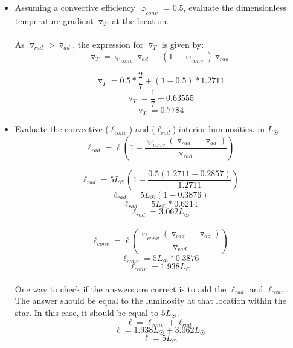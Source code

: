 \documentclass[10pt]{article}
\begin{document}
\begin{itemize}[label=\textbullet]
\item Assuming a convective efficiency $\upvarphi_{conv}$ = 0.5, evaluate the dimensionless temperature gradient $\triangledown_{T}$ at the location.
\\ \\
As $\triangledown_{rad} > \triangledown_{ad}$, the expression for $\triangledown_{T}$ is given by:
\[ \triangledown_{T} = \upvarphi_{conv} \triangledown_{ad} + (1 - \upvarphi_{conv}) \triangledown_{rad}\]

\[ \triangledown_{T} = 0.5*\frac{2}{7} + (1 - 0.5) * 1.2711\]
\[ \triangledown_{T} = \frac{1}{7} + 0.63555\]
\[ \triangledown_{T} = 0.7784\]
\item Evaluate the convective ($\ell_{conv}$) and ($\ell_{rad}$) interior luminosities, in $L_{\astrosun}$
\\
\[ \ell_{rad} = \ell (1 - \frac{\upvarphi_{conv} (\triangledown_{rad} - \triangledown_{ad})}{\triangledown_{rad}})\]

\[ \ell_{rad} = 5L_{\astrosun} (1 - \frac{0.5 (1.2711 - 0.2857)}{1.2711})\]
\[ \ell_{rad} = 5L_{\astrosun} (1 - 0.3876)\]
\[ \ell_{rad} = 5L_{\astrosun}*0.6214\]
\[ \ell_{rad} = 3.062L_{\astrosun}\] \\

\[ \ell_{conv} = \ell (\frac{\upvarphi_{conv} (\triangledown_{rad} - \triangledown_{ad})}{\triangledown_{rad}})\]
\[ \ell_{conv} = 5L_{\astrosun}*0.3876\]
\[ \ell_{conv} = 1.938L_{\astrosun}\]\\

One way to check if the answers are correct is to add the $\ell_{rad}$ and $\ell_{conv}$. The answer should be equal to the luminosity at that location within the star. In this case, it should be equal to $5L_{\astrosun}$.
\[ \ell = \ell_{conv} + \ell_{rad}\]
\[ \ell = 1.938L_{\astrosun} + 3.062L_{\astrosun}\]
\[ \ell = 5L_{\astrosun}\]
\end{itemize}
\end{document}
